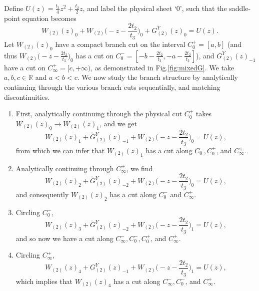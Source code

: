 Define $U(z) = \frac{t_3}{4}z^2 + \frac{t_2}{2}z$, and label the physical sheet `0', such that the
saddle-point equation becomes
%
\begin{equation}
    W_{(2)}(z)_0 + W_{(2)}\big(-z-\frac{2t_2}{t_3}\big)_0 + G_{(2)}^Y(z)_0 = U(z).
\end{equation}
%
Let $W_{(2)}(z)_0$ have a compact branch cut on the interval $C_0^+=[a,b]$ (and thus
$W_{(2)}\big(-z-\frac{2t_2}{t_3}\big)_0$ has a cut on
$C_0^-=[-b-\frac{2t_2}{t_3},-a-\frac{2t_2}{t_3}]$), and $G_{(2)}^Y(z)_{-1}$ have a cut on
$C_{\infty}^+=[c,+\infty)$, as demonstrated in Fig.\ref{fig:mixedG}. We take $a,b,c\in \mathbb{R}$
and $a< b < c$. We now study the branch structure by analytically continuing through the various
branch cuts sequentially, and matching discontinuities.
\begin{enumerate}[label=(\roman*)]
    \item First, analytically continuing through the physical cut $C_0^+$ takes $W_{(2)}(z)_0 \rightarrow
              W_{(2)}(z)_1$, and we get
          \begin{equation}
              W_{(2)}(z)_1 + G_{(2)}^Y(z)_{-1} + W_{(2)}\big(-z-\frac{2t_2}{t_3}\big)_0 = U(z),
          \end{equation}
          from which we can infer that $W_{(2)}(z)_1$ has a cut along $C_0^-,C_0^+$, and $C_\infty^+$.

    \item Analytically continuing through $C_{\infty}^+$, we find
          \begin{equation}
              W_{(2)}(z)_2 + G_{(2)}^Y(z)_{-2}+W_{(2)}\big(-z-\frac{2t_2}{t_3}\big)_0 = U(z),
          \end{equation}
          and consequently $W_{(2)}(z)_2$ has a cut along $C_0^-$ and $C_{\infty}^+$.

    \item Circling $C_0^-$,
          \begin{equation}
              W_{(2)}(z)_3 + G_{(2)}^Y(z)_{-2}+W_{(2)}\big(-z-\frac{2t_2}{t_3}\big)_{1}=U(z),
          \end{equation}
          and so now we have a cut along $C_{\infty}^-, C_0^-, C_0^+$, and $C_{\infty}^+$.

    \item Circling $C_{\infty}^+$,
          \begin{equation}
              W_{(2)}(z)_4 + G_{(2)}^Y(z)_{-1} + W_{(2)}\big(-z-\frac{2t_2}{t_3}\big)_1 = U(z),
          \end{equation}
          which implies that $W_{(2)}(z)_4$ has a cut along $C_{\infty}^-, C_0^-$, and $C_{\infty}^+$.


\end{enumerate}

